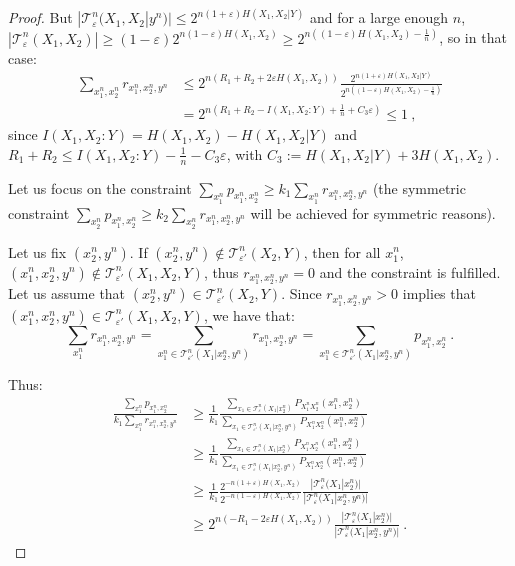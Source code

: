 \begin{proof}
    But $|\mathcal{T}^n_{\varepsilon}(X_1,X_2|y^n)| \leq 2^{n(1+\varepsilon)H(X_1,X_2|Y)}$ and for a large enough $n$, $|\mathcal{T}^n_{\varepsilon}(X_1,X_2)| \geq (1-\varepsilon)2^{n(1-\varepsilon)H(X_1,X_2)} \geq 2^{n\left((1-\varepsilon)H(X_1,X_2) - \frac{1}{n}\right)}$, so in that case:
    \begin{equation}
      \begin{aligned}
        \sum_{x_1^n,x_2^n} r_{x_1^n,x_2^n,y^n} &\leq 2^{n(R_1+R_2 + 2\varepsilon H(X_1,X_2))}\frac{2^{n(1+\varepsilon)H(X_1,X_2|Y)}}{2^{n\left((1-\varepsilon)H(X_1,X_2) - \frac{1}{n}\right)}}\\
        &= 2^{n\left(R_1+R_2 - I(X_1,X_2:Y) + \frac{1}{n} + C_3\varepsilon\right)} \leq 1 \ ,
      \end{aligned}
    \end{equation}
    since $I(X_1,X_2:Y) = H(X_1,X_2) - H(X_1,X_2|Y)$ and $R_1+R_2 \leq I(X_1,X_2:Y) - \frac{1}{n} - C_3\varepsilon$, with $C_3 := H(X_1,X_2|Y) + 3H(X_1,X_2)$.

    Let us focus on the constraint $\sum_{x_1^n} p_{x_1^n,x_2^n} \geq k_1 \sum_{x_1^n} r_{x_1^n,x_2^n,y^n}$ (the symmetric constraint $\sum_{x_2^n} p_{x_1^n,x_2^n} \geq k_2 \sum_{x_2^n} r_{x_1^n,x_2^n,y^n}$ will be achieved for symmetric reasons).

    Let us fix $(x_2^n,y^n)$. If $(x_2^n,y^n) \not\in \mathcal{T}^n_{\varepsilon'}(X_2,Y)$, then for all $x_1^n$, $(x_1^n,x_2^n,y^n) \not\in \mathcal{T}^n_{\varepsilon'}(X_1,X_2,Y)$, thus $r_{x_1^n,x_2^n,y^n} = 0$ and the constraint is fulfilled. Let us assume that $(x_2^n,y^n) \in \mathcal{T}^n_{\varepsilon'}(X_2,Y)$. Since $r_{x_1^n,x_2^n,y^n} > 0$ implies that $(x_1^n,x_2^n,y^n) \in \mathcal{T}^n_{\varepsilon'}(X_1,X_2,Y)$, we have that:
    \[ \sum_{x_1^n} r_{x_1^n,x_2^n,y^n} = \sum_{x_1^n \in \mathcal{T}^n_{\varepsilon'}(X_1|x_2^n,y^n)} r_{x_1^n,x_2^n,y^n} = \sum_{x_1^n \in \mathcal{T}^n_{\varepsilon'}(X_1|x_2^n,y^n)} p_{x_1^n,x_2^n} \ .\]
    
    Thus:
     \begin{equation}
      \begin{aligned}
        \frac{\sum_{x_1^n} p_{x_1^n,x_2^n}}{k_1\sum_{x_1^n} r_{x_1^n,x_2^n,y^n}} &\geq \frac{1}{k_1} \frac{ \sum_{x_1 \in \mathcal{T}^n_{\varepsilon}(X_1|x_2^n)}P_{X_1^nX_2^n}(x_1^n,x_2^n)}{\sum_{x_1 \in \mathcal{T}^n_{\varepsilon'}(X_1|x_2^n,y^n)} P_{X_1^nX_2^n}(x_1^n,x_2^n)}\\
        &\geq \frac{1}{k_1} \frac{ \sum_{x_1 \in \mathcal{T}^n_{\varepsilon}(X_1|x_2^n)}P_{X_1^nX_2^n}(x_1^n,x_2^n)}{\sum_{x_1 \in \mathcal{T}^n_{\varepsilon}(X_1|x_2^n,y^n)} P_{X_1^nX_2^n}(x_1^n,x_2^n)}\\
        &\geq \frac{1}{k_1}\frac{2^{-n(1+\varepsilon)H(X_1,X_2)}}{2^{-n(1-\varepsilon)H(X_1,X_2)}}\frac{|\mathcal{T}^n_{\varepsilon}(X_1|x_2^n)|}{|\mathcal{T}^n_{\varepsilon}(X_1|x_2^n,y^n)|}\\
        &\geq 2^{n(-R_1-2\varepsilon H(X_1,X_2))}\frac{|\mathcal{T}^n_{\varepsilon}(X_1|x_2^n)|}{|\mathcal{T}^n_{\varepsilon}(X_1|x_2^n,y^n)|}\ .
      \end{aligned}
    \end{equation}


\end{proof}
